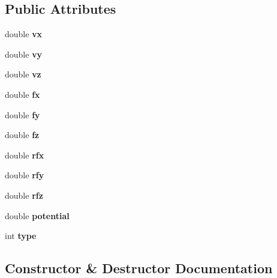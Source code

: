 \subsection*{Public Attributes}
\begin{DoxyCompactItemize}
\item 
\mbox{\label{classCMolecule_adfbd57e11262264d1085003ce6980e0e}} 
double {\bfseries vx}
\item 
\mbox{\label{classCMolecule_a940450fd2115a50185bc25d62d222bfa}} 
double {\bfseries vy}
\item 
\mbox{\label{classCMolecule_a6958f8a29883dcb7c9b95b6d4b672a04}} 
double {\bfseries vz}
\item 
\mbox{\label{classCMolecule_afdf067ddb470fd2abd5bfd51b725421c}} 
double {\bfseries fx}
\item 
\mbox{\label{classCMolecule_ac193b9e1e9a9bba2ac8ec5a92509dc75}} 
double {\bfseries fy}
\item 
\mbox{\label{classCMolecule_a98856c34c33ffbb79dd672f68df7495f}} 
double {\bfseries fz}
\item 
\mbox{\label{classCMolecule_a8b406afe8e1b88c5ad285fbcab5cf4d0}} 
double {\bfseries rfx}
\item 
\mbox{\label{classCMolecule_a3397d14c0de2638847411f990159f817}} 
double {\bfseries rfy}
\item 
\mbox{\label{classCMolecule_a662bb860661423a13952f53bf347ee0a}} 
double {\bfseries rfz}
\item 
\mbox{\label{classCMolecule_ae38677450bdb6d4dacfa739381e30e64}} 
double {\bfseries potential}
\item 
\mbox{\label{classCMolecule_a5e11f667a1757d5eac1e14090acbbe94}} 
int {\bfseries type}
\end{DoxyCompactItemize}


\subsection{Constructor \& Destructor Documentation}
\mbox{\label{classCMolecule_a6e4328f4451a293bb1405bbde90a4ced}} 

